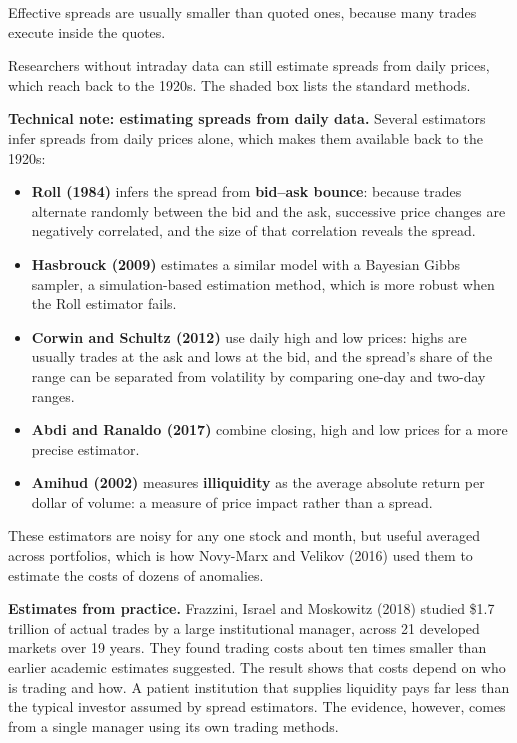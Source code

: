 Effective spreads are usually smaller than quoted ones, because many trades execute inside the quotes.

Researchers without intraday data can still estimate spreads from daily prices, which reach back to the 1920s. The shaded box lists the standard methods.

\begin{technote}
\textbf{Technical note: estimating spreads from daily data.} Several estimators infer spreads from daily prices alone, which makes them available back to the 1920s:

\begin{itemize}
  \item \textbf{Roll (1984)} infers the spread from \textbf{bid--ask bounce}: because trades alternate randomly between the bid and the ask, successive price changes are negatively correlated, and the size of that correlation reveals the spread.
  \item \textbf{Hasbrouck (2009)} estimates a similar model with a Bayesian Gibbs sampler, a simulation-based estimation method, which is more robust when the Roll estimator fails.
  \item \textbf{Corwin and Schultz (2012)} use daily high and low prices: highs are usually trades at the ask and lows at the bid, and the spread's share of the range can be separated from volatility by comparing one-day and two-day ranges.
  \item \textbf{Abdi and Ranaldo (2017)} combine closing, high and low prices for a more precise estimator.
  \item \textbf{Amihud (2002)} measures \textbf{illiquidity} as the average absolute return per dollar of volume: a measure of price impact rather than a spread.
\end{itemize}

These estimators are noisy for any one stock and month, but useful averaged across portfolios, which is how Novy-Marx and Velikov (2016) used them to estimate the costs of dozens of anomalies.
\end{technote}

\textbf{Estimates from practice.} Frazzini, Israel and Moskowitz (2018) studied \$1.7 trillion of actual trades by a large institutional manager, across 21 developed markets over 19 years. They found trading costs about ten times smaller than earlier academic estimates suggested. The result shows that costs depend on who is trading and how. A patient institution that supplies liquidity pays far less than the typical investor assumed by spread estimators. The evidence, however, comes from a single manager using its own trading methods.

